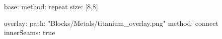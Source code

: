 base:
  method: repeat
  size: [8,8]
  
overlay:
  path: "Blocks/Metals/titanium_overlay.png"
  method: connect
  innerSeams: true